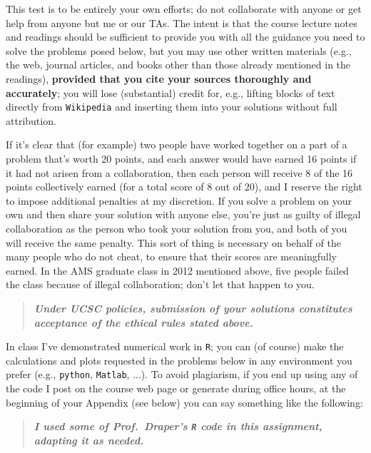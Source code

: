 \documentclass[12pt]{article}
\newcommand{\bi}[1]{\b{\i{#1}}}
\renewcommand{\b}[1]{\textbf{#1}}
\renewcommand{\i}[1]{\textit{#1}}
\renewcommand{\t}[1]{\texttt{#1}}
\begin{document}
This test is to be entirely your own efforts; do not collaborate with
anyone or get help from anyone but me or our TAs. The intent is that the course lecture notes and readings should be sufficient to provide you with all the guidance you need to solve the problems posed below, but you may use other written materials (e.g., the web, journal articles, and books other than those already mentioned in the readings),
\textbf{provided that you cite your sources thoroughly and accurately}; you
will lose (substantial) credit for, e.g., lifting blocks of text directly
from \texttt{Wikipedia} and inserting them into your solutions without full
attribution.

If it's clear that (for example) two people have worked together on a part
of a problem that's worth 20 points, and each answer would have earned 16
points if it had not arisen from a collaboration, then each person will
receive 8 of the 16 points collectively earned (for a total score of 8 out
of 20), and I reserve the right to impose additional penalties at my
discretion. If you solve a problem on your own and then share your solution
with anyone else, you're just as guilty of illegal collaboration as
the person who took your solution from you, and both of you will receive
the same penalty. This sort of thing is necessary on behalf of the many
people who do not cheat, to ensure that their scores are meaningfully
earned. In the AMS graduate class in 2012 mentioned above, five people failed the class because of illegal collaboration; don't let that happen to you.

\begin{quote}

\bi{Under UCSC policies, submission of your solutions constitutes acceptance of the ethical rules stated above.}

\end{quote}

In class I've demonstrated numerical work in \texttt{R}; you can (of course) make the calculations and plots requested in the problems below in any environment you prefer (e.g., \t{python}, \texttt{Matlab}, ...). To avoid plagiarism, if you end up using any of the code I post on the course web page or generate during office hours, at the beginning of your Appendix (see below) you can say something like the following:

\begin{quote}

\bi{I used some of Prof.~Draper's \texttt{R} code in this assignment, adapting it as needed.}

\end{quote}
\end{document}
